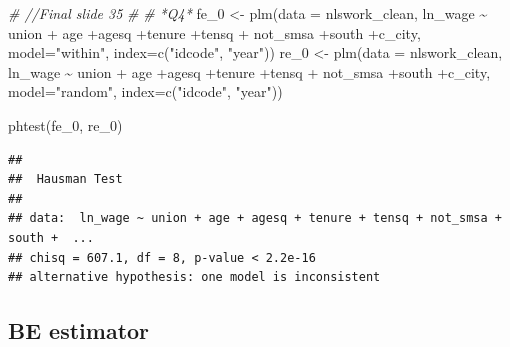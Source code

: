 \documentclass[
]{article}
\newenvironment{Shaded}{\begin{snugshade}}{\end{snugshade}}
\newcommand{\AttributeTok}[1]{\textcolor[rgb]{0.77,0.63,0.00}{#1}}
\newcommand{\CommentTok}[1]{\textcolor[rgb]{0.56,0.35,0.01}{\textit{#1}}}
\newcommand{\FunctionTok}[1]{\textcolor[rgb]{0.00,0.00,0.00}{#1}}
\newcommand{\NormalTok}[1]{#1}
\newcommand{\OtherTok}[1]{\textcolor[rgb]{0.56,0.35,0.01}{#1}}
\newcommand{\SpecialCharTok}[1]{\textcolor[rgb]{0.00,0.00,0.00}{#1}}
\newcommand{\StringTok}[1]{\textcolor[rgb]{0.31,0.60,0.02}{#1}}
\begin{document}
\begin{Shaded}
\begin{Highlighting}[]
\CommentTok{\# //Final slide 35}
\CommentTok{\# }
\CommentTok{\# *Q4*}
\NormalTok{  fe\_0 }\OtherTok{\textless{}{-}} \FunctionTok{plm}\NormalTok{(}\AttributeTok{data =}\NormalTok{ nlswork\_clean, ln\_wage }\SpecialCharTok{\textasciitilde{}}\NormalTok{ union }\SpecialCharTok{+}
\NormalTok{                age }\SpecialCharTok{+}\NormalTok{agesq }\SpecialCharTok{+}\NormalTok{tenure }\SpecialCharTok{+}\NormalTok{tensq }\SpecialCharTok{+}
\NormalTok{                not\_smsa }\SpecialCharTok{+}\NormalTok{south }\SpecialCharTok{+}\NormalTok{c\_city, }\AttributeTok{model=}\StringTok{"within"}\NormalTok{, }\AttributeTok{index=}\FunctionTok{c}\NormalTok{(}\StringTok{"idcode"}\NormalTok{, }\StringTok{"year"}\NormalTok{))}
\NormalTok{  re\_0 }\OtherTok{\textless{}{-}} \FunctionTok{plm}\NormalTok{(}\AttributeTok{data =}\NormalTok{ nlswork\_clean, ln\_wage }\SpecialCharTok{\textasciitilde{}}\NormalTok{ union }\SpecialCharTok{+}
\NormalTok{                age }\SpecialCharTok{+}\NormalTok{agesq }\SpecialCharTok{+}\NormalTok{tenure }\SpecialCharTok{+}\NormalTok{tensq }\SpecialCharTok{+}
\NormalTok{                not\_smsa }\SpecialCharTok{+}\NormalTok{south }\SpecialCharTok{+}\NormalTok{c\_city, }\AttributeTok{model=}\StringTok{"random"}\NormalTok{, }\AttributeTok{index=}\FunctionTok{c}\NormalTok{(}\StringTok{"idcode"}\NormalTok{, }\StringTok{"year"}\NormalTok{))}
  
  \FunctionTok{phtest}\NormalTok{(fe\_0, re\_0)    }
\end{Highlighting}
\end{Shaded}

\begin{verbatim}
## 
##  Hausman Test
## 
## data:  ln_wage ~ union + age + agesq + tenure + tensq + not_smsa + south +  ...
## chisq = 607.1, df = 8, p-value < 2.2e-16
## alternative hypothesis: one model is inconsistent
\end{verbatim}

\hypertarget{be-estimator}{%
\subsection{BE estimator}\label{be-estimator}}
\end{document}
